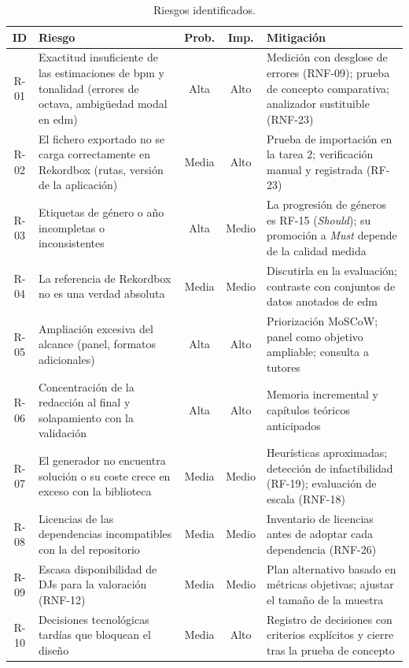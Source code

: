 \begin{table}[htbp]
  \centering
  \caption{Riesgos identificados.}
  \label{tab:met-riesgos}
  \footnotesize
  \begin{tabularx}{\textwidth}{|c|X|c|c|X|}
    \hline
    \textbf{ID} & \textbf{Riesgo} & \textbf{Prob.} & \textbf{Imp.} & \textbf{Mitigación} \\
    \hline
    R-01 & Exactitud insuficiente de las estimaciones de \acs{bpm} y tonalidad (errores de octava, ambigüedad modal en \acs{edm}) & Alta & Alto & Medición con desglose de errores (RNF-09); prueba de concepto comparativa; analizador sustituible (RNF-23) \\
    \hline
    R-02 & El fichero exportado no se carga correctamente en Rekordbox (rutas, versión de la aplicación) & Media & Alto & Prueba de importación en la tarea 2; verificación manual y registrada (RF-23) \\
    \hline
    R-03 & Etiquetas de género o año incompletas o inconsistentes & Alta & Medio & La progresión de géneros es RF-15 (\emph{Should}); su promoción a \emph{Must} depende de la calidad medida \\
    \hline
    R-04 & La referencia de Rekordbox no es una verdad absoluta & Media & Medio & Discutirla en la evaluación; contraste con conjuntos de datos anotados de \acs{edm} \\
    \hline
    R-05 & Ampliación excesiva del alcance (panel, formatos adicionales) & Alta & Alto & Priorización MoSCoW; panel como objetivo ampliable; consulta a tutores \\
    \hline
    R-06 & Concentración de la redacción al final y solapamiento con la validación & Alta & Alto & Memoria incremental y capítulos teóricos anticipados \\
    \hline
    R-07 & El generador no encuentra solución o su coste crece en exceso con la biblioteca & Media & Medio & Heurísticas aproximadas; detección de infactibilidad (RF-19); evaluación de escala (RNF-18) \\
    \hline
    R-08 & Licencias de las dependencias incompatibles con la del repositorio & Media & Medio & Inventario de licencias antes de adoptar cada dependencia (RNF-26) \\
    \hline
    R-09 & Escasa disponibilidad de DJs para la valoración (RNF-12) & Media & Medio & Plan alternativo basado en métricas objetivas; ajustar el tamaño de la muestra \\
    \hline
    R-10 & Decisiones tecnológicas tardías que bloquean el diseño & Media & Alto & Registro de decisiones con criterios explícitos y cierre tras la prueba de concepto \\
    \hline
  \end{tabularx}
\end{table}

